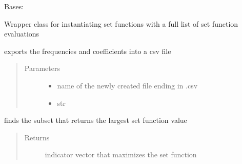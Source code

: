 \documentclass[letterpaper,10pt,english]{sphinxmanual}
\begin{document}
\begin{fulllineitems}
\label{\detokenize{setFTs:setFTs.setfunctions.WrapSignal}}
\sphinxAtStartPar
Bases: {\hyperref[\detokenize{setFTs:setFTs.setfunctions.SetFunction}]{}}

\sphinxAtStartPar
Wrapper class for instantiating set functions with a full list of set function evaluations

\begin{fulllineitems}
\label{\detokenize{setFTs:setFTs.setfunctions.WrapSignal.export_to_csv}}
\sphinxAtStartPar
exports the frequencies and coefficients into a csv file
\begin{quote}\begin{description}
\item[{Parameters}] \leavevmode\begin{itemize}
\item {} 
\sphinxAtStartPar
{} \textendash{} name of the newly created file ending in .csv

\item {} 
\sphinxAtStartPar
{} \textendash{} str

\end{itemize}

\end{description}\end{quote}

\end{fulllineitems}


\begin{fulllineitems}
\label{\detokenize{setFTs:setFTs.setfunctions.WrapSignal.max}}
\sphinxAtStartPar
finds the subset that returns the largest set function value
\begin{quote}\begin{description}
\item[{Returns}] \leavevmode
\sphinxAtStartPar
indicator vector that maximizes the set function


\end{description}
\end{quote}
\end{fulllineitems}
\end{fulllineitems}
\end{document}

